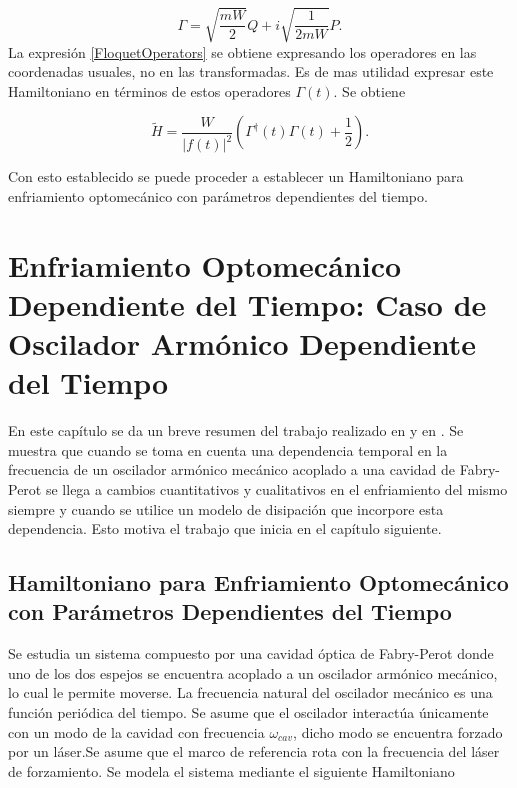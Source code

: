 \documentclass[10pt,a4paper]{report}
\begin{document}
\begin{equation}
\Gamma = \sqrt{\frac{mW}{2}}Q + i \sqrt{\frac{1}{2mW}}P.
\end{equation} La expresión \eqref{FloquetOperators} se obtiene expresando los operadores en las coordenadas usuales, no en las transformadas. Es de mas utilidad expresar este Hamiltoniano en términos de estos operadores $\Gamma(t)$. Se obtiene

\begin{equation}
\tilde{H} = \frac{W}{|f(t)|^2}(\Gamma^\dagger(t)\Gamma(t) + \frac{1}{2}).
\end{equation}

Con esto establecido se puede proceder a establecer un Hamiltoniano para enfriamiento optomecánico con parámetros dependientes del tiempo.



\chapter{Enfriamiento Optomecánico Dependiente del Tiempo: Caso de Oscilador Armónico Dependiente del Tiempo}

En este capítulo se da un breve resumen del trabajo realizado en \cite{TesisMaestria} y en \cite{YanesOC}. Se muestra que  cuando se toma en cuenta una dependencia temporal en la frecuencia  de un oscilador armónico mecánico acoplado a una cavidad de Fabry-Perot se llega a cambios cuantitativos y cualitativos en el enfriamiento del mismo siempre y cuando se utilice un modelo de disipación que incorpore esta dependencia. Esto motiva el trabajo que inicia en el capítulo siguiente.


\section{Hamiltoniano para Enfriamiento Optomecánico con Parámetros Dependientes del Tiempo}

Se estudia un sistema compuesto por una cavidad óptica de Fabry-Perot donde uno de los dos espejos se encuentra acoplado a un oscilador armónico mecánico, lo cual le permite moverse. La frecuencia natural del oscilador mecánico es una función periódica del tiempo. Se asume que el oscilador interactúa únicamente con un modo de la cavidad  con frecuencia $\omega_{cav}$, dicho modo se encuentra forzado por un láser.Se asume que el marco de referencia rota con la frecuencia del láser de forzamiento. Se modela el sistema mediante el siguiente Hamiltoniano\cite{BarberisLC}
\end{document}
